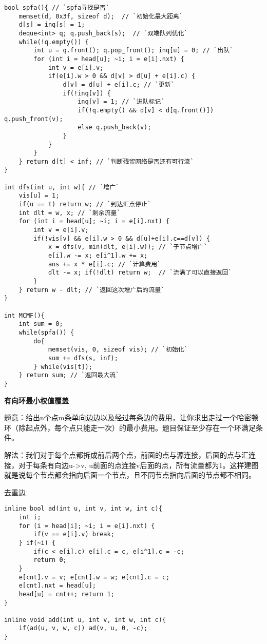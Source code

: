 \begin{lstlisting}
bool spfa(){ // `spfa寻找是否`
    memset(d, 0x3f, sizeof d);  // `初始化最大距离`
    d[s] = inq[s] = 1;  
    deque<int> q; q.push_back(s);  // `双端队列优化`
    while(!q.empty()) {
        int u = q.front(); q.pop_front(); inq[u] = 0; // `出队`
        for (int i = head[u]; ~i; i = e[i].nxt) {
            int v = e[i].v;
            if(e[i].w > 0 && d[v] > d[u] + e[i].c) {
                d[v] = d[u] + e[i].c; // `更新`
                if(!inq[v]) {
                    inq[v] = 1; // `进队标记`
                    if(!q.empty() && d[v] < d[q.front()]) q.push_front(v);
                    else q.push_back(v);
                }
            }
        }
    } return d[t] < inf; // `判断残留网络是否还有可行流`
}

int dfs(int u, int w){ // `增广`
    vis[u] = 1;
    if(u == t) return w; // `到达汇点停止`
    int dlt = w, x; // `剩余流量`
    for (int i = head[u]; ~i; i = e[i].nxt) {
        int v = e[i].v;
        if(!vis[v] && e[i].w > 0 && d[u]+e[i].c==d[v]) {
            x = dfs(v, min(dlt, e[i].w)); // `子节点增广`
            e[i].w -= x; e[i^1].w += x;
            ans += x * e[i].c; // `计算费用`
            dlt -= x; if(!dlt) return w;  // `流满了可以直接返回`
        }
    } return w - dlt; // `返回这次增广后的流量`
}

int MCMF(){
    int sum = 0;
    while(spfa()) {
        do{
            memset(vis, 0, sizeof vis); // `初始化`
            sum += dfs(s, inf);
        } while(vis[t]);
    } return sum; // `返回最大流`
}
\end{lstlisting}

{\bfseries 有向环最小权值覆盖}

题意：给出n个点m条单向边边以及经过每条边的费用，让你求出走过一个哈密顿环（除起点外，每个点只能走一次）的最小费用。题目保证至少存在一个环满足条件。 

解法：我们对于每个点都拆成前后两个点，前面的点与源连接，后面的点与汇连接，对于每条有向边u->v, u前面的点连接v后面的点，所有流量都为1。这样建图就是说每个节点都会指向后面一个节点，且不同节点指向后面的节点都不相同。

去重边
\begin{lstlisting}
inline bool ad(int u, int v, int w, int c){
    int i;
    for (i = head[i]; ~i; i = e[i].nxt) {
        if(v == e[i].v) break;
    } if(~i) {
        if(c < e[i].c) e[i].c = c, e[i^1].c = -c;
        return 0;
    }
    e[cnt].v = v; e[cnt].w = w; e[cnt].c = c;
    e[cnt].nxt = head[u];
    head[u] = cnt++; return 1;
}

inline void add(int u, int v, int w, int c){
    if(ad(u, v, w, c)) ad(v, u, 0, -c);
}
\end{lstlisting}


